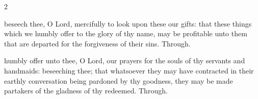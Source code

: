 \begin{multicols}{2}
\secret

\vspace{-0.25\baselineskip}

 beseech thee, O Lord, mercifully to look upon these our gifts: that these things which we humbly offer to the glory of thy name, may be profitable unto them that are departed for the forgiveness of their sins. Through.

\vspace{-0.5\baselineskip}

\postcommunion

\vspace{-0.25\baselineskip}

 humbly offer unto thee, O Lord, our prayers for the souls of thy servants and handmaids: beseeching thee; that whatsoever they may have contracted in their earthly conversation being pardoned by thy goodness, they may be made partakers of the gladness of thy redeemed. Through.
\end{multicols}